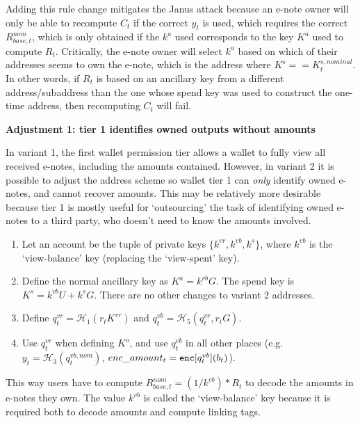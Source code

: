 Adding this rule change mitigates the Janus attack because an e-note owner will only be able to recompute $C_t$ if the correct $y_t$ is used, which requires the correct $R^{nom}_{base,t}$, which is only obtained if the $k^a$ used corresponds to the key $K^a$ used to compute $R_t$. Critically, the e-note owner will select $k^a$ based on which of their addresses seems to own the e-note, which is the address where $K^s == K^{s,nominal}_t$. In other words, if $R_t$ is based on an ancillary key from a different address/subaddress than the one whose spend key was used to construct the one-time address, then recomputing $C_t$ will fail.

\textbf{Adjustment 1: tier 1 identifies owned outputs without amounts}

In variant 1, the first wallet permission tier allows a wallet to fully view all received e-notes, including the amounts contained. However, in variant 2 it is possible to adjust the address scheme so wallet tier 1 can {\em only} identify owned e-notes, and cannot recover amounts. This may be relatively more desirable because tier 1 is mostly useful for `outsourcing' the task of identifying owned e-notes to a third party, who doesn't need to know the amounts involved.

\begin{enumerate}
    \item Let an account be the tuple of private keys $\{k^{vr}, k^{vb}, k^s\}$, where $k^{vb}$ is the `view-balance' key (replacing the `view-spent' key).

    \item Define the normal ancillary key as $K^a = k^{vb} G$. The spend key is $K^s = k^{vb} U + k^s G$. There are no other changes to variant 2 addresses.

    \item Define $q^{vr}_t = \mathcal{H}_1(r_t K^{vr})$ and $q^{vb}_t = \mathcal{H}_5(q^{vr}_t, r_t G)$.

    \item Use $q^{vr}_t$ when defining $K^o$, and use $q^{vb}_t$ in all other places (e.g.\ $y_t = \mathcal{H}_3(q^{vb,nom}_t)$, $enc\_amount_t = \textrm{\tt enc}[q^{vb}_t](b_t)$).
\end{enumerate}

This way users have to compute $R^{nom}_{base,t} = (1/k^{vb})*R_t$ to decode the amounts in e-notes they own. The value $k^{vb}$ is called the `view-balance' key because it is required both to decode amounts and compute linking tags.

